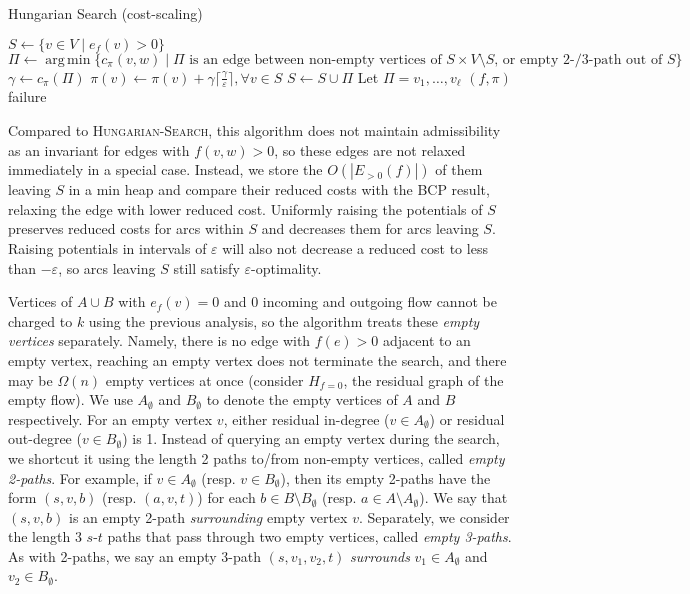 \documentclass[11pt]{article}
\def\eps{\varepsilon}
\DeclareMathOperator*{\argmin}{arg\,min}
\theoremstyle{plain}
\begin{document}
\begin{algorithm}
\caption{Hungarian Search (cost-scaling)}
\begin{algorithmic}[1]
	\State $S \gets \{v \in V \mid e_f(v) > 0\}$
	\Repeat
		\State $\Pi \gets \argmin\{c_\pi(v, w) \mid \text{$\Pi$ is an edge between non-empty vertices of $S \times V \setminus S$, or empty 2-/3-path out of $S$}\}$
		\State $\gamma \gets c_\pi(\Pi)$
			\State $\pi(v) \gets \pi(v) + \gamma\lceil\frac{\gamma}{\eps}\rceil, \forall v \in S$
		\EndIf
		\State $S \gets S \cup \Pi$
		\Statex %
		\State Let $\Pi = v_1, \ldots, v_\ell$
		 
			\State\Return $(f, \pi)$
		\EndIf
	\State\Return failure
\EndFunction
\end{algorithmic}
\end{algorithm}

Compared to \textsc{Hungarian-Search}, this algorithm does not maintain
admissibility as an invariant for edges with $f(v, w) > 0$, so these edges are
not relaxed immediately in a special case.
Instead, we store the $O(|E_{>0}(f)|)$ of them leaving $S$ in a min heap and
compare their reduced costs with the BCP result, relaxing the edge with lower
reduced cost.
Uniformly raising the potentials of $S$ preserves reduced costs for arcs within
$S$ and decreases them for arcs leaving $S$.
Raising potentials in intervals of $\eps$ will also not decrease a reduced
cost to less than $-\eps$, so arcs leaving $S$ still satisfy $\eps$-optimality.

Vertices of $A \cup B$ with $e_f(v) = 0$ and 0 incoming and outgoing flow
cannot be charged to $k$ using the previous analysis, so the algorithm treats
these \emph{empty vertices} separately.
Namely, there is no edge with $f(e) > 0$ adjacent to an empty vertex,
reaching an empty vertex does not terminate the search, and there may be
$\Omega(n)$ empty vertices at once (consider $H_{f = 0}$, the residual graph
of the empty flow).
We use $A_\emptyset$ and $B_\emptyset$ to denote the empty vertices of $A$ and
$B$ respectively.
For an empty vertex $v$, either residual in-degree ($v \in A_\emptyset$) or
residual out-degree ($v \in B_\emptyset$) is 1.
Instead of querying an empty vertex during the search, we shortcut it using the
length 2 paths to/from non-empty vertices, called \emph{empty 2-paths}.
For example, if $v \in A_\emptyset$ (resp. $v \in B_\emptyset$), then its empty
2-paths have the form $(s, v, b)$ (resp. $(a, v, t)$) for each
$b \in B \setminus B_\emptyset$ (resp. $a \in A \setminus A_\emptyset$).
We say that $(s, v, b)$ is an empty 2-path \emph{surrounding} empty vertex $v$.
Separately, we consider the length 3 $s$-$t$ paths that pass through two empty
vertices, called \emph{empty 3-paths}.
As with 2-paths, we say an empty 3-path $(s, v_1, v_2, t)$ \emph{surrounds}
$v_1 \in A_\emptyset$ and $v_2 \in B_\emptyset$.
\end{document}
